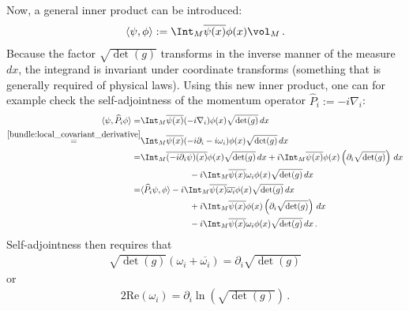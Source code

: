     Now, a general inner product can be introduced:
    \begin{gather}
        \langle\psi,\phi\rangle := \Int_M\overline{\psi(x)}\phi(x)\vol_M\,.
    \end{gather}
    Because the factor $\sqrt{\det(g)}$ transforms in the inverse manner of the measure $dx$, the integrand is invariant under coordinate transforms (something that is generally required of physical laws). Using this new inner product, one can for example check the self-adjointness of the momentum operator $\widehat{P}_i := -i\nabla_i$:
    \begin{align*}
        \langle\psi,\widehat{P}_i\phi\rangle = &\Int_M\overline{\psi(x)}(-i\nabla_i)\phi(x)\sqrt{\det(g)}\,dx\\
        \overset{\cref{bundle:local_covariant_derivative}}{=} &\Int_M\overline{\psi(x)}(-i\partial_i - i\omega_i)\phi(x)\sqrt{\det(g)}\,dx\\
        = &\Int_M\overline{(-i\partial_i\psi)(x)}\phi(x)\sqrt{\det(g)}\,dx+i\Int_M\overline{\psi(x)}\phi(x)\left(\partial_i\sqrt{\det(g)}\right)\,dx\\
            &\hspace{2cm} -i\Int_M\overline{\psi(x)}\omega_i\phi(x)\sqrt{\det(g)}\,dx\\
        = &\langle\widehat{P}_i\psi,\phi\rangle -i\Int_M\overline{\psi(x)}\overline{\omega_i}\phi(x)\sqrt{\det(g)}\,dx\\
            &\hspace{2cm} + i\Int_M\overline{\psi(x)}\phi(x)\left(\partial_i\sqrt{\det(g)}\right)\,dx\\
            &\hspace{2cm} -i\Int_M\overline{\psi(x)}\omega_i\phi(x)\sqrt{\det(g)}\,dx\,.
    \end{align*}
    Self-adjointness then requires that
    \begin{gather}
        \sqrt{\det(g)}(\omega_i + \overline{\omega_i}) = \partial_i\sqrt{\det(g)}
    \end{gather}
    or
    \begin{gather}
        2\mathrm{Re}(\omega_i) = \partial_i\ln\left(\sqrt{\det(g)}\right)\,.
    \end{gather}
    

\section{}

